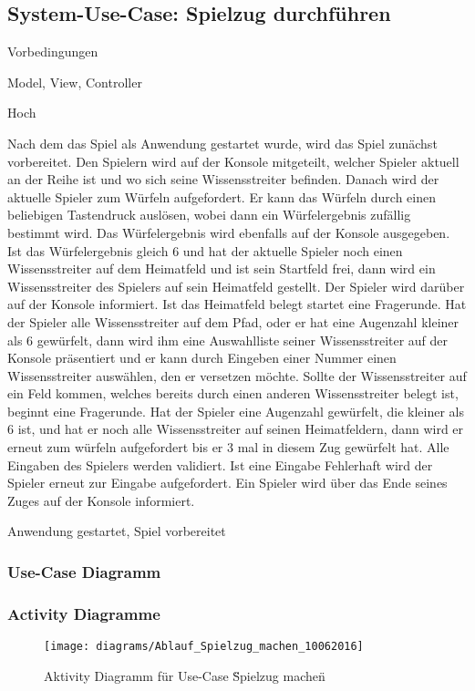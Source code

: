 \subsection{System-Use-Case: Spielzug durchführen}
\begin{labeling}[:]{Vorbedingungen}
\item [Akteure] Model, View, Controller
\item [Priorität] Hoch
\item [Beschreibung] Nach dem das Spiel als Anwendung gestartet wurde, wird das Spiel zunächst vorbereitet. Den Spielern wird auf der Konsole mitgeteilt, welcher Spieler aktuell an der Reihe ist und wo sich seine Wissensstreiter befinden. Danach wird der aktuelle Spieler zum Würfeln aufgefordert. Er kann das Würfeln durch einen beliebigen Tastendruck auslösen, wobei dann ein Würfelergebnis zufällig bestimmt wird. Das Würfelergebnis wird ebenfalls auf der Konsole ausgegeben.
Ist das Würfelergebnis gleich 6 und hat der aktuelle Spieler noch einen Wissensstreiter auf dem Heimatfeld und  ist sein Startfeld frei, dann wird ein Wissensstreiter des Spielers auf sein Heimatfeld gestellt. Der Spieler wird darüber auf der Konsole informiert. Ist das Heimatfeld belegt startet eine Fragerunde.
Hat der Spieler alle Wissensstreiter auf dem Pfad, oder er hat eine Augenzahl kleiner als 6 gewürfelt, dann wird ihm eine Auswahlliste seiner Wissensstreiter auf der Konsole präsentiert und er kann durch Eingeben einer Nummer einen Wissensstreiter auswählen, den er versetzen möchte. Sollte der Wissensstreiter auf ein Feld kommen, welches bereits durch einen anderen Wissensstreiter belegt ist, beginnt eine Fragerunde.
Hat der Spieler eine Augenzahl gewürfelt, die kleiner als 6 ist, und hat er noch alle Wissensstreiter auf seinen Heimatfeldern, dann wird er erneut zum würfeln aufgefordert bis er 3 mal in diesem Zug gewürfelt hat.
Alle Eingaben des Spielers werden validiert. Ist eine Eingabe Fehlerhaft wird der Spieler erneut zur Eingabe aufgefordert.
Ein Spieler wird über das Ende seines Zuges auf der Konsole informiert.
\item [Vorbedingungen] Anwendung gestartet, Spiel vorbereitet
\item [Offene Punkte]
\end{labeling}

\subsubsection{Use-Case Diagramm}

\subsubsection{Activity Diagramme}
\begin{figure}[h]
  \begin{center}
    \texttt{[image: diagrams/Ablauf\_Spielzug\_machen\_10062016]}
    \caption{Aktivity Diagramm für Use-Case \"Spielzug machen\"}
  \end{center}
\end{figure}


